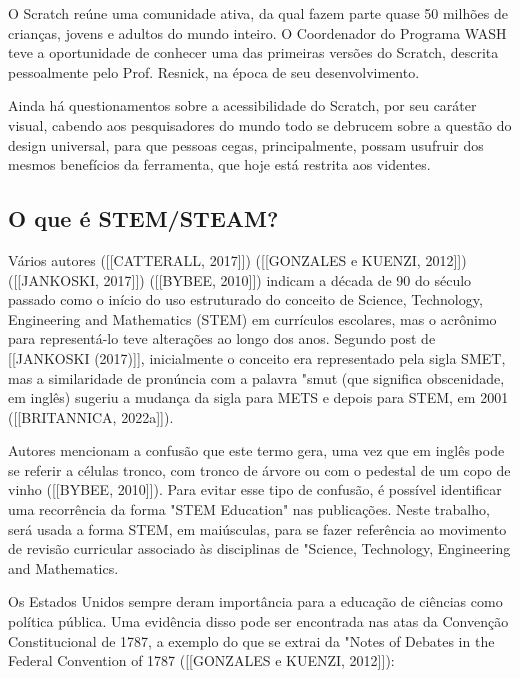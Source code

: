 O Scratch reúne uma comunidade ativa, da qual fazem parte quase 50 milhões de crianças, jovens e adultos do mundo inteiro. O Coordenador do Programa WASH teve a oportunidade de conhecer uma das primeiras versões do Scratch, descrita pessoalmente pelo Prof. Resnick, na época de seu desenvolvimento.

Ainda há questionamentos sobre a acessibilidade do Scratch, por seu caráter visual, cabendo aos pesquisadores do mundo todo se debrucem sobre a questão do design universal, para que pessoas cegas, principalmente, possam usufruir dos mesmos benefícios da ferramenta, que hoje está restrita aos videntes.

\subsection[O que é STEM/STEAM?]{O que é STEM/STEAM?}\label{O que é STEM/STEAM?}
Vários autores ([[CATTERALL, 2017]])  ([[GONZALES e KUENZI, 2012]])  ([[JANKOSKI, 2017]])  ([[BYBEE, 2010]]) indicam a década de 90 do século passado como o início do uso estruturado do conceito de Science, Technology, Engineering and Mathematics (STEM) em currículos escolares, mas o acrônimo para representá-lo teve alterações ao longo dos anos. 
Segundo post de  [[JANKOSKI (2017)]], inicialmente o conceito era representado pela sigla SMET, mas a similaridade de pronúncia com a palavra "smut (que significa obscenidade, em inglês) sugeriu a mudança da sigla para METS e depois para STEM, em 2001  ([[BRITANNICA, 2022a]]).

Autores mencionam a confusão que este termo gera, uma vez que em inglês pode se referir a células tronco, com tronco de árvore ou com o pedestal de um copo de vinho  ([[BYBEE, 2010]]). Para evitar esse tipo de confusão, é possível identificar uma recorrência da forma "STEM Education" nas publicações. Neste trabalho, será usada a forma STEM, em maiúsculas, para se fazer referência ao movimento de revisão curricular associado às disciplinas de "Science, Technology, Engineering and Mathematics.

Os Estados Unidos sempre deram importância para a educação de ciências como política pública. Uma evidência disso pode ser encontrada nas atas da Convenção Constitucional de 1787, a exemplo do que se extrai da "Notes of Debates in the Federal Convention of 1787  ([[GONZALES e KUENZI, 2012]]):


\noindent\begin{center}\mbox{\centering{}}\end{center}


